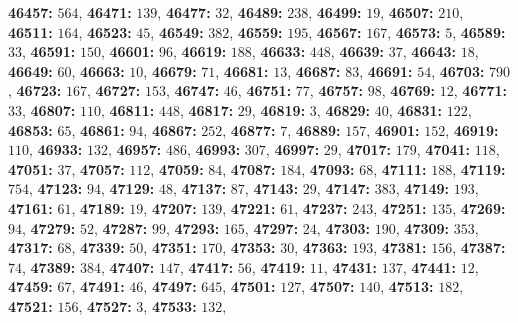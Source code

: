\textsf{\bfseries 46457:} $564$, \textsf{\bfseries 46471:} $139$, \textsf{\bfseries 46477:} $32$, \textsf{\bfseries 46489:} $238$, \textsf{\bfseries 46499:} $19$, \textsf{\bfseries 46507:} $210$, \textsf{\bfseries 46511:} $164$, \textsf{\bfseries 46523:} $45$, \textsf{\bfseries 46549:} $382$, \textsf{\bfseries 46559:} $195$, \textsf{\bfseries 46567:} $167$, \textsf{\bfseries 46573:} $5$, \textsf{\bfseries 46589:} $33$, \textsf{\bfseries 46591:} $150$, \textsf{\bfseries 46601:} $96$, \textsf{\bfseries 46619:} $188$, \textsf{\bfseries 46633:} $448$, \textsf{\bfseries 46639:} $37$, \textsf{\bfseries 46643:} $18$, \textsf{\bfseries 46649:} $60$, \textsf{\bfseries 46663:} $10$, \textsf{\bfseries 46679:} $71$, \textsf{\bfseries 46681:} $13$, \textsf{\bfseries 46687:} $83$, \textsf{\bfseries 46691:} $54$, \textsf{\bfseries 46703:} $790$, \textsf{\bfseries 46723:} $167$, \textsf{\bfseries 46727:} $153$, \textsf{\bfseries 46747:} $46$, \textsf{\bfseries 46751:} $77$, \textsf{\bfseries 46757:} $98$, \textsf{\bfseries 46769:} $12$, \textsf{\bfseries 46771:} $33$, \textsf{\bfseries 46807:} $110$, \textsf{\bfseries 46811:} $448$, \textsf{\bfseries 46817:} $29$, \textsf{\bfseries 46819:} $3$, \textsf{\bfseries 46829:} $40$, \textsf{\bfseries 46831:} $122$, \textsf{\bfseries 46853:} $65$, \textsf{\bfseries 46861:} $94$, \textsf{\bfseries 46867:} $252$, \textsf{\bfseries 46877:} $7$, \textsf{\bfseries 46889:} $157$, \textsf{\bfseries 46901:} $152$, \textsf{\bfseries 46919:} $110$, \textsf{\bfseries 46933:} $132$, \textsf{\bfseries 46957:} $486$, \textsf{\bfseries 46993:} $307$, \textsf{\bfseries 46997:} $29$, \textsf{\bfseries 47017:} $179$, \textsf{\bfseries 47041:} $118$, \textsf{\bfseries 47051:} $37$, \textsf{\bfseries 47057:} $112$, \textsf{\bfseries 47059:} $84$, \textsf{\bfseries 47087:} $184$, \textsf{\bfseries 47093:} $68$, \textsf{\bfseries 47111:} $188$, \textsf{\bfseries 47119:} $754$, \textsf{\bfseries 47123:} $94$, \textsf{\bfseries 47129:} $48$, \textsf{\bfseries 47137:} $87$, \textsf{\bfseries 47143:} $29$, \textsf{\bfseries 47147:} $383$, \textsf{\bfseries 47149:} $193$, \textsf{\bfseries 47161:} $61$, \textsf{\bfseries 47189:} $19$, \textsf{\bfseries 47207:} $139$, \textsf{\bfseries 47221:} $61$, \textsf{\bfseries 47237:} $243$, \textsf{\bfseries 47251:} $135$, \textsf{\bfseries 47269:} $94$, \textsf{\bfseries 47279:} $52$, \textsf{\bfseries 47287:} $99$, \textsf{\bfseries 47293:} $165$, \textsf{\bfseries 47297:} $24$, \textsf{\bfseries 47303:} $190$, \textsf{\bfseries 47309:} $353$, \textsf{\bfseries 47317:} $68$, \textsf{\bfseries 47339:} $50$, \textsf{\bfseries 47351:} $170$, \textsf{\bfseries 47353:} $30$, \textsf{\bfseries 47363:} $193$, \textsf{\bfseries 47381:} $156$, \textsf{\bfseries 47387:} $74$, \textsf{\bfseries 47389:} $384$, \textsf{\bfseries 47407:} $147$, \textsf{\bfseries 47417:} $56$, \textsf{\bfseries 47419:} $11$, \textsf{\bfseries 47431:} $137$, \textsf{\bfseries 47441:} $12$, \textsf{\bfseries 47459:} $67$, \textsf{\bfseries 47491:} $46$, \textsf{\bfseries 47497:} $645$, \textsf{\bfseries 47501:} $127$, \textsf{\bfseries 47507:} $140$, \textsf{\bfseries 47513:} $182$, \textsf{\bfseries 47521:} $156$, \textsf{\bfseries 47527:} $3$, \textsf{\bfseries 47533:} $132$, 
